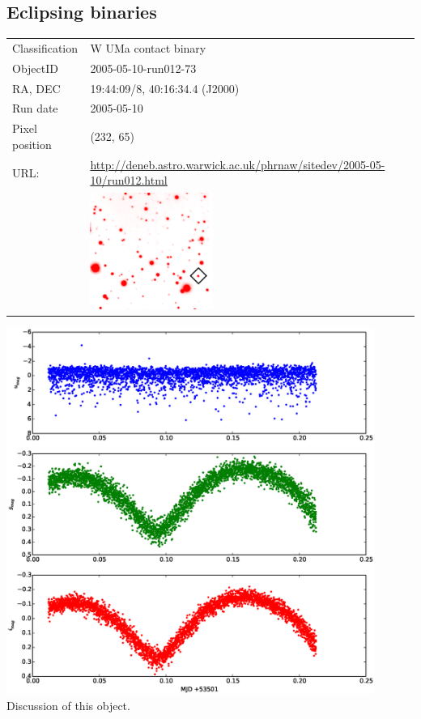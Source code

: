 \newpage
\subsection{Eclipsing binaries}

  \begin{tabular}{l l}
  Classification & {W UMa} contact binary \\
  ObjectID & 2005-05-10-run012-73 \\
  RA, DEC & 19:44:09/8, 40:16:34.4 (J2000) \\
  Run date & 2005-05-10 \\
  Pixel position & (232, 65) \\
  URL: & \small \url{http://deneb.astro.warwick.ac.uk/phrnaw/sitedev/2005-05-10/run012.html} \\
       & \includegraphics[width=40mm]{images/2005-05-10-run012-73.png} \\
  \end{tabular}
  \includegraphics[width=120mm]{images/2005-05-10-run012-73-lightcurve.eps} \\
  Discussion of this object.

